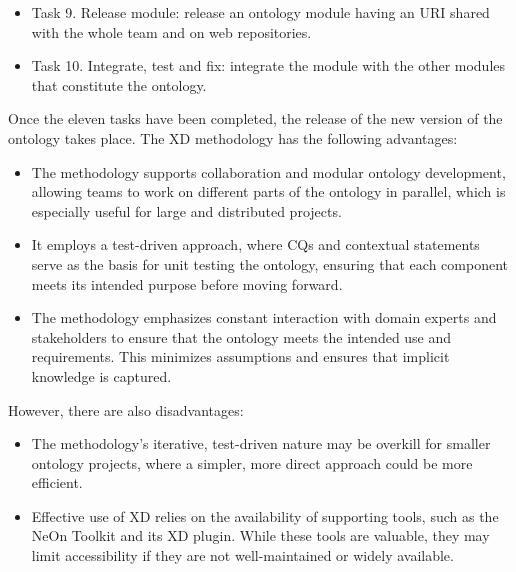 \begin{itemize}
    \item Task 9. Release module: release an ontology module having an URI shared with the whole team and on web repositories.

    \item Task 10. Integrate, test and fix: integrate the module with the other modules that constitute the ontology.
\end{itemize}

Once the eleven tasks have been completed, the release of the new version of the ontology takes place.
The XD methodology has the following advantages:
\begin{itemize}
    \item The methodology supports collaboration and modular ontology development, allowing teams to work on different parts of the ontology in parallel, which is especially useful for large and distributed projects.

    \item It employs a test-driven approach, where CQs and contextual statements serve as the basis for unit testing the ontology, ensuring that each component meets its intended purpose before moving forward.

    \item The methodology emphasizes constant interaction with domain experts and stakeholders to ensure that the ontology meets the intended use and requirements. This minimizes assumptions and ensures that implicit knowledge is captured.
\end{itemize}
However, there are also disadvantages:
\begin{itemize}
    \item The methodology's iterative, test-driven nature may be overkill for smaller ontology projects, where a simpler, more direct approach could be more efficient.

    \item Effective use of XD relies on the availability of supporting tools, such as the NeOn Toolkit and its XD plugin. While these tools are valuable, they may limit accessibility if they are not well-maintained or widely available.
\end{itemize}

